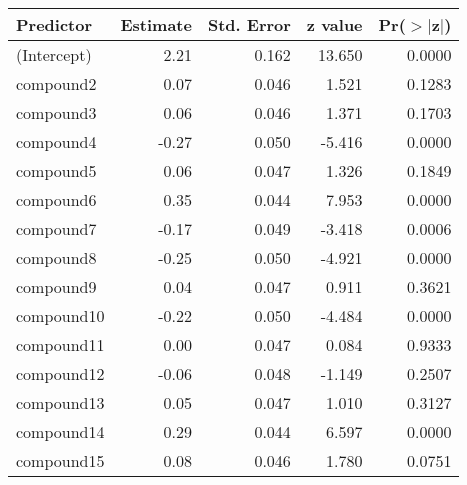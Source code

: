 \begin{table}[ht]
\centering
\begin{tabular}{lrrrr}
  \hline
Predictor & Estimate & Std. Error & z value & Pr($>$$|$z$|$) \\ 
  \hline
(Intercept) & 2.21 & 0.162 & 13.650 & 0.0000 \\ 
  compound2 & 0.07 & 0.046 & 1.521 & 0.1283 \\ 
  compound3 & 0.06 & 0.046 & 1.371 & 0.1703 \\ 
  compound4 & -0.27 & 0.050 & -5.416 & 0.0000 \\ 
  compound5 & 0.06 & 0.047 & 1.326 & 0.1849 \\ 
  compound6 & 0.35 & 0.044 & 7.953 & 0.0000 \\ 
  compound7 & -0.17 & 0.049 & -3.418 & 0.0006 \\ 
  compound8 & -0.25 & 0.050 & -4.921 & 0.0000 \\ 
  compound9 & 0.04 & 0.047 & 0.911 & 0.3621 \\ 
  compound10 & -0.22 & 0.050 & -4.484 & 0.0000 \\ 
  compound11 & 0.00 & 0.047 & 0.084 & 0.9333 \\ 
  compound12 & -0.06 & 0.048 & -1.149 & 0.2507 \\ 
  compound13 & 0.05 & 0.047 & 1.010 & 0.3127 \\ 
  compound14 & 0.29 & 0.044 & 6.597 & 0.0000 \\ 
  compound15 & 0.08 & 0.046 & 1.780 & 0.0751 \\ 
   \hline
\end{tabular}
\end{table}
